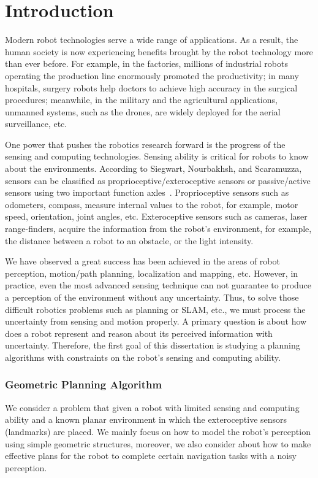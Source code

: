 \chapter{Introduction} 
\label{chp:intro}

Modern robot technologies serve a wide range of applications. 
%
As a result, the human society is now experiencing benefits brought by the robot technology more than ever before.
%
For example,
in the factories, millions of industrial robots operating the production line enormously promoted the productivity; in many hospitals, surgery robots help doctors to achieve high accuracy in the surgical procedures; meanwhile, in the military and the agricultural applications, unmanned systems, such as the drones, are widely deployed for the aerial surveillance, etc. 


%
One power that pushes the robotics research forward is the progress of the sensing and computing technologies. 
%
Sensing ability is critical for robots to know about the environments. 
According to Siegwart, Nourbakhsh, and Scaramuzza, sensors can be classified as proprioceptive/exteroceptive sensors or passive/active sensors using two important function axles~\cite{SieNouSca11}.
%
Proprioceptive sensors such as odometers,
compass, measure internal values to the robot, for example, motor speed, orientation, joint angles, etc.
%
Exteroceptive sensors such as cameras, laser range-finders, acquire the information from the robot's environment, for example, the distance between a robot to an obstacle, or the light intensity. 

%
We have observed a great success has been achieved in the areas of robot perception, motion/path planning, localization and mapping, etc. 
%
However, in practice, even the most advanced sensing technique can not guarantee to produce a perception of the
environment without any uncertainty.  
%
Thus, to solve those difficult robotics problems such as planning or SLAM, etc., we must process the uncertainty from sensing and motion properly.
%
A primary question is about how does a robot represent and reason about its perceived information with uncertainty.
%
Therefore, the first goal of this dissertation is studying a planning algorithms with constraints on the robot's sensing and computing ability.

\subsection{Geometric Planning Algorithm}
We consider a problem that given a robot with limited sensing and computing
ability and a known planar environment in which the exteroceptive sensors (landmarks) are
placed. We mainly focus on how to model the robot's perception using simple
geometric structures, moreover, we also consider about how to make effective plans for the robot  to complete certain navigation tasks with a noisy perception.

